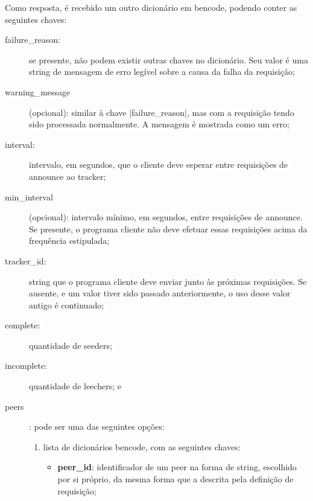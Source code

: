 
Como resposta, é recebido um outro dicionário em \gls*{bencode}, podendo conter as
seguintes chaves:

\begin{description}
    \item[failure\_reason:] se presente, não podem existir outras chaves no dicionário.
        Seu valor é uma \gls*{string} de mensagem de erro legível sobre a causa da falha
        da requisição;

    \item[warning\_message] (opcional): similar à chave \bverb|failure_reason|, mas com
        a requisição tendo sido processada normalmente. A mensagem é mostrada como um
        erro;

    \item[interval:] intervalo, em segundos, que o cliente deve esperar entre
        requisições de \gls*{announce} ao \gls*{tracker};

    \item[min\_interval] (opcional): intervalo mínimo, em segundos, entre requisições
        de \gls*{announce}. Se presente, o programa cliente não deve efetuar essas
        requisições acima da frequência estipulada;

    \item[tracker\_id:] \gls*{string} que o programa cliente deve enviar junto às
        próximas requisições. Se ausente, e um valor tiver sido passado anteriormente, o
        uso desse valor antigo é continuado;

    \item[complete:] quantidade de \glspl*{seeder};

    \item[incomplete:] quantidade de \glspl*{leecher}; e

    \item[\glspl*{peer}]: pode ser uma das seguintes opções:

        \begin{enumerate}
            \item lista de dicionários \gls*{bencode}, com as seguintes chaves:

            \begin{itemize}
                \item \textbf{peer\_id}: identificador de um \gls*{peer} na forma de
                    \gls*{string}, escolhido por si próprio, da mesma forma que a
                    descrita pela definição de requisição;


\end{itemize}
\end{enumerate}
\end{description}
